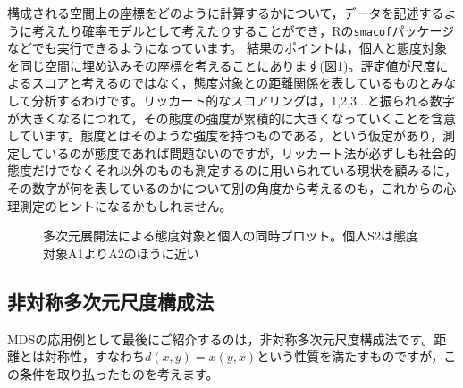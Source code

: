 \documentclass{ltjsbook}
\begin{document}
構成される空間上の座標をどのように計算するかについて，データを記述するように考えたり確率モデルとして考えたりすることができ，Rの\verb|smacof|パッケージなどでも実行できるようになっています。
結果のポイントは，個人と態度対象を同じ空間に埋め込みその座標を考えることにあります(図\ref{Unfolding2})。評定値が尺度によるスコアと考えるのではなく，態度対象との距離関係を表しているものとみなして分析するわけです。リッカート的なスコアリングは，1,2,3...と振られる数字が大きくなるにつれて，その態度の強度が累積的に大きくなっていくことを含意しています。態度とはそのような強度を持つものである，という仮定があり，測定しているのが態度であれば問題ないのですが，リッカート法が必ずしも社会的態度だけでなくそれ以外のものも測定するのに用いられている現状を顧みるに，その数字が何を表しているのかについて別の角度から考えるのも，これからの心理測定のヒントになるかもしれません。
\begin{figure}[ht]
    \begin{center}
        \caption{多次元展開法による態度対象と個人の同時プロット。個人S2は態度対象A1よりA2のほうに近い}
        \label{Unfolding2}
    \end{center}
\end{figure}
\subsection{非対称多次元尺度構成法}
MDSの応用例として最後にご紹介するのは，非対称多次元尺度構成法です。距離とは対称性，すなわち$d(x,y)=x(y,x)$という性質を満たすものですが，この条件を取り払ったものを考えます。
\end{document}
